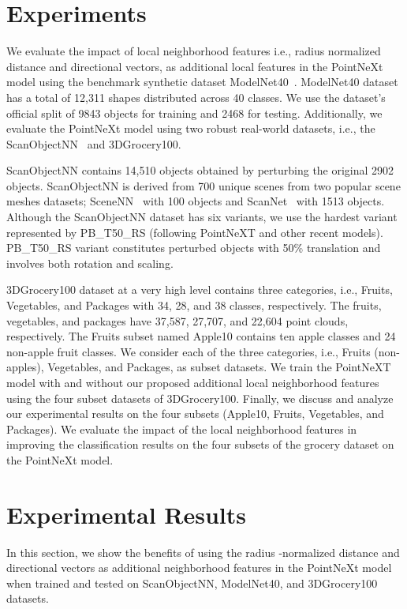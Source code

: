 \documentclass[runningheads]{llncs}
\begin{document}
\section{Experiments}
We evaluate the impact of local neighborhood features i.e., radius normalized distance and directional vectors, as additional local features in the PointNeXt model using the benchmark synthetic dataset ModelNet40~\cite{wu20153d}. ModelNet40 dataset has a total of 12,311 shapes distributed across 40 classes. We use the dataset's official split of 9843 objects for training and 2468 for testing. Additionally, we evaluate the PointNeXt model using two robust real-world datasets, i.e., the ScanObjectNN~\cite{uy2019revisiting} and 3DGrocery100. 

ScanObjectNN contains 14,510 objects obtained by perturbing the original 2902 objects. ScanObjectNN is derived from 700 unique scenes from two popular scene meshes datasets; SceneNN~\cite{hua2016scenenn} with 100 objects and ScanNet~\cite{dai2017scannet} with 1513 objects. Although the ScanObjectNN dataset has six variants, we use the hardest variant represented by PB\_T50\_RS (following PointNeXT and other recent models).  PB\_T50\_RS variant constitutes perturbed objects with 50\% translation and involves both rotation and scaling. 

3DGrocery100 dataset at a very high level contains three categories, i.e., Fruits, Vegetables, and Packages with 34, 28, and 38 classes, respectively. The fruits, vegetables, and packages have 37,587, 27,707, and 22,604 point clouds, respectively. The Fruits subset named Apple10 contains ten apple classes and 24 non-apple fruit classes. We consider each of the three categories, i.e., Fruits (non-apples), Vegetables, and Packages, as subset datasets. We train the PointNeXT model with and without our proposed additional local neighborhood features using the four subset datasets of 3DGrocery100. Finally, we discuss and analyze our experimental results on the four subsets (Apple10, Fruits, Vegetables, and Packages). We evaluate the impact of the local neighborhood features in improving the classification results on the four subsets of the grocery dataset on the PointNeXt model. 

\section{Experimental Results}
In this section, we show the benefits of using the radius -normalized distance and directional vectors as additional neighborhood features in the PointNeXt model when trained and tested on ScanObjectNN, ModelNet40, and 3DGrocery100 datasets.
\end{document}
